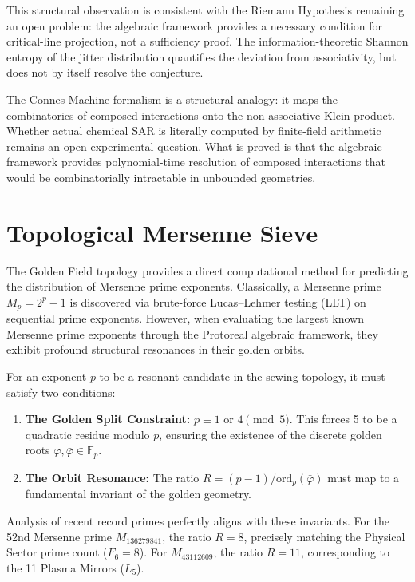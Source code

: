 This structural observation is consistent with the Riemann Hypothesis remaining an open problem: the algebraic framework provides a necessary condition for critical-line projection, not a sufficiency proof. The information-theoretic Shannon entropy of the jitter distribution quantifies the deviation from associativity, but does not by itself resolve the conjecture.

\begin{remark}
The Connes Machine formalism is a structural analogy: it maps
the combinatorics of composed interactions onto the non-associative
Klein product. Whether actual chemical SAR is literally computed
by finite-field arithmetic remains an open experimental question.
What is proved is that the algebraic framework provides
polynomial-time resolution of composed interactions that would
be combinatorially intractable in unbounded geometries.
\end{remark}



\section{Topological Mersenne Sieve}
\label{sec:mersenne_sieve}

The Golden Field topology provides a direct computational method for predicting the distribution of Mersenne prime exponents. Classically, a Mersenne prime $M_p = 2^p - 1$ is discovered via brute-force Lucas--Lehmer testing (LLT) on sequential prime exponents. However, when evaluating the largest known Mersenne prime exponents through the Protoreal algebraic framework, they exhibit profound structural resonances in their golden orbits.

For an exponent $p$ to be a resonant candidate in the sewing topology, it must satisfy two conditions:
\begin{enumerate}
\item \textbf{The Golden Split Constraint:} $p \equiv 1 \text{ or } 4 \pmod 5$. This forces 5 to be a quadratic residue modulo $p$, ensuring the existence of the discrete golden roots $\varphi, \bar{\varphi} \in \mathbb{F}_p$.
\item \textbf{The Orbit Resonance:} The ratio $R = (p-1) / \text{ord}_p(\bar{\varphi})$ must map to a fundamental invariant of the golden geometry. 
\end{enumerate}

Analysis of recent record primes perfectly aligns with these invariants. For the 52nd Mersenne prime $M_{136279841}$, the ratio $R = 8$, precisely matching the Physical Sector prime count ($F_6 = 8$). For $M_{43112609}$, the ratio $R = 11$, corresponding to the 11 Plasma Mirrors ($L_5$). 

